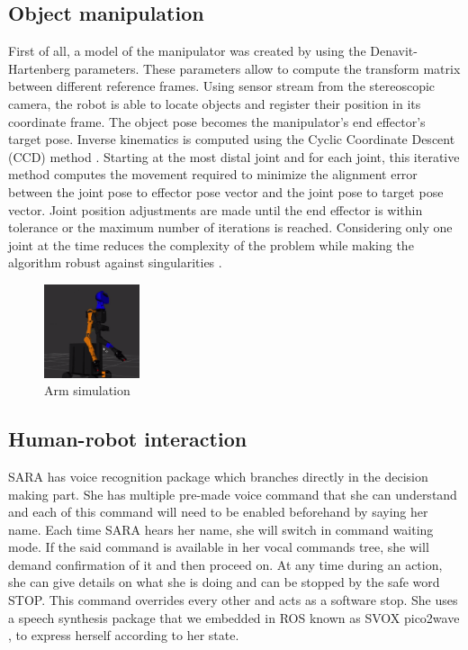 \documentclass[runningheads,a4paper]{llncs}
\begin{document}
\subsection{Object manipulation}
\tab First of all, a model of the manipulator was created by using the Denavit-Hartenberg \cite{kinematic} parameters. These parameters allow to compute the transform matrix between different reference frames. Using sensor stream from the stereoscopic camera, the robot is able to locate objects and register their position in its coordinate frame. The object pose becomes the manipulator's end effector's target pose. Inverse kinematics is computed using the Cyclic Coordinate Descent (CCD) method \cite{coordinate}. Starting at the most distal joint and for each joint, this iterative method computes the movement required to minimize the alignment error between the joint pose to effector pose vector and the joint pose to target pose vector. Joint position adjustments are made until the end effector is within tolerance or the maximum number of iterations is reached. Considering only one joint at the time reduces the complexity of the problem while making the algorithm robust against singularities \cite{springer}. 
\begin{figure}
\centering
\includegraphics[width=0.25\textwidth]{images/arm_sim.png}
\caption{Arm simulation}
\end{figure}


\subsection{Human-robot interaction}
\tab SARA has voice recognition package which branches directly in the decision making part. She has multiple pre-made voice command that she can understand and each of this command will need to be enabled beforehand by saying her name. Each time SARA hears her name, she will switch in command waiting mode. If the said command is available in her vocal commands tree, she will demand confirmation of it and then proceed on. At any time during an action, she can give details on what she is doing and can be stopped by the safe word STOP. This command overrides every other and acts as a software stop. She uses a speech synthesis package that we embedded in ROS known as SVOX pico2wave \cite{svox}, to express herself according to her state.\\
\end{document}
